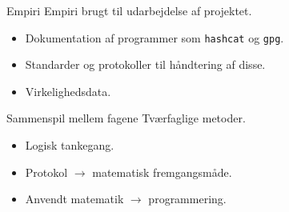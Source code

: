 \documentclass[10pt, aspectratio=169, usepdftitle=false]{beamer}
\begin{document}
\begin{frame}{Empiri}
    \large
    \alert{Empiri brugt til udarbejdelse af projektet.}
    \begin{itemize}
        \item Dokumentation af programmer som \texttt{hashcat} og \texttt{gpg}.
        \item Standarder og protokoller til håndtering af disse.
        \item Virkelighedsdata.
    \end{itemize}
\end{frame}

\begin{frame}{Sammenspil mellem fagene}
    \large
    \alert{Tværfaglige metoder.}
    \begin{itemize}
        \item Logisk tankegang.
        \item Protokol \(\rightarrow\) matematisk fremgangsmåde.
        \item Anvendt matematik \(\rightarrow\) programmering.
    \end{itemize}
\end{frame}
\end{document}

